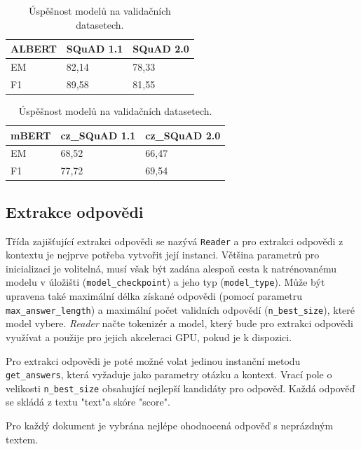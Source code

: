 \begin{table}[h]
\centering
    \begin{tabular}{| l | l | l |}
        \hline
        \textbf{ALBERT} & SQuAD 1.1 & SQuAD 2.0 \\ \hline
        EM              & 82,14      & 78,33      \\ \hline
        F1              & 89,58      & 81,55      \\ \hline
    \end{tabular}
    \begin{tabular}{| l | l | l |}
        \hline
        \textbf{mBERT} & cz\_SQuAD 1.1 & cz\_SQuAD 2.0 \\ \hline
        EM              & 68,52      & 66,47      \\ \hline
        F1              & 77,72      & 69,54      \\ \hline
    \end{tabular}
    \caption{
    Úspěšnost modelů na validačních datasetech.
    }
    \label{tab:reader_trained}
\end{table}

\subsection{Extrakce odpovědi}
Třída zajišťující extrakci odpovědi se nazývá \texttt{Reader} a pro extrakci odpovědi z kontextu je nejprve potřeba vytvořit její instanci. Většina parametrů pro inicializaci je volitelná, musí však být zadána alespoň cesta k natrénovanému modelu v úložišti (\texttt{model\_checkpoint}) a jeho typ (\texttt{model\_type}). Může být upravena také maximální délka získané odpovědi (pomocí parametru\texttt{ max\_answer\_length}) a maximální počet validních odpovědí (\texttt{n\_best\_size}), které model vybere. \emph{Reader} načte tokenizér a model, který bude pro extrakci odpovědi využívat a použije pro jejich akceleraci GPU, pokud je k dispozici.\par
Pro extrakci odpovědi je poté možné volat jedinou instanční metodu \texttt{get\_answers}, která vyžaduje jako parametry otázku a kontext. Vrací pole o velikosti \texttt{n\_best\_size} obsahující nejlepší kandidáty pro odpověď. Každá odpověď se skládá z textu "text"\;a skóre "score".\par
Pro každý dokument je vybrána nejlépe ohodnocená odpověď s neprázdným textem.

